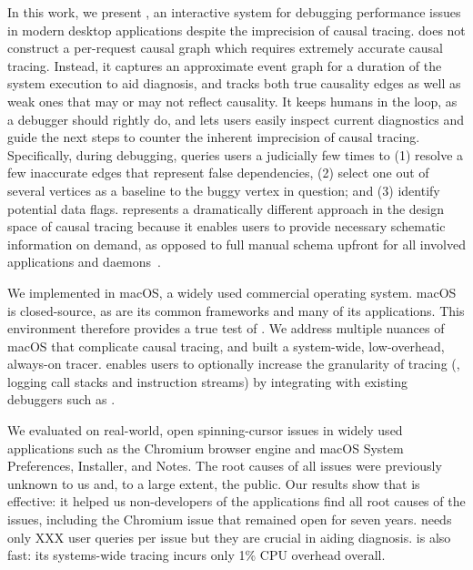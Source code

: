 In this work, we present \xxx, an interactive system for debugging
performance issues in modern desktop applications despite the imprecision
of causal tracing. \xxx does not construct a per-request causal graph
which requires extremely accurate causal tracing.  Instead, it captures an
approximate event graph for a duration of the system execution to aid
diagnosis, and tracks both true causality edges as well as weak ones that
may or may not reflect causality.  It keeps humans in the loop, as a
debugger should rightly do,
and lets users easily inspect current diagnostics and guide the next steps
to counter the inherent imprecision of causal tracing.  Specifically,
during debugging, \xxx queries users a judicially few times to (1) resolve
a few inaccurate edges that represent false dependencies, (2) select one
out of several vertices as a baseline to the buggy vertex in question; and
(3) identify potential data flags.  \xxx represents a dramatically
different approach in the design space of causal tracing because it
enables users to provide necessary schematic information on demand, as
opposed to full manual schema upfront for all involved applications and
daemons~\cite{barham2004using}.

We implemented \xxx in macOS, a widely used commercial operating
system. macOS is closed-source, as are its common frameworks and many of
its applications.  This environment therefore provides a true test of
\xxx.  We address multiple nuances of macOS that complicate causal
tracing, and built a system-wide, low-overhead, always-on tracer.  \xxx
enables users to optionally increase the granularity of tracing (\eg,
logging call stacks and instruction streams) by integrating with existing
debuggers such as .

We evaluated \xxx on \nbug real-world, open spinning-cursor issues in
widely used applications such as the Chromium browser engine and macOS
System Preferences, Installer, and Notes.  The root causes of all \nbug
issues were previously unknown to us and, to a large extent, the
public. Our results show that \xxx is effective: it helped us
non-developers of the applications find all root causes of the issues,
including the Chromium issue that remained open for seven years.  \xxx
needs only XXX user queries per issue but they are crucial in aiding
diagnosis. \xxx is also fast: its systems-wide tracing incurs only 1\% CPU
overhead overall.


